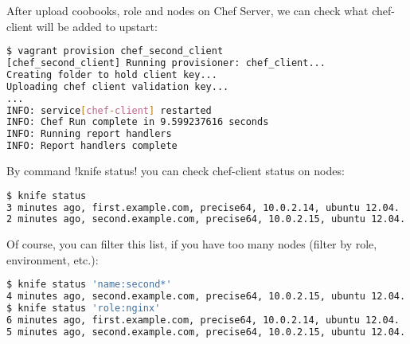After upload coobooks, role and nodes on Chef Server, we can check what chef-client will be added to upstart:

\begin{lstlisting}[language=Bash,label=lst:my-server-cloud-knife-ssh9]
$ vagrant provision chef_second_client
[chef_second_client] Running provisioner: chef_client...
Creating folder to hold client key...
Uploading chef client validation key...
...
INFO: service[chef-client] restarted
INFO: Chef Run complete in 9.599237616 seconds
INFO: Running report handlers
INFO: Report handlers complete
\end{lstlisting}

By command \inline!knife status! you can check chef-client status on nodes:

\begin{lstlisting}[language=Bash,label=lst:my-server-cloud-knife-ssh10]
$ knife status
3 minutes ago, first.example.com, precise64, 10.0.2.14, ubuntu 12.04.
2 minutes ago, second.example.com, precise64, 10.0.2.15, ubuntu 12.04.
\end{lstlisting}

Of course, you can filter this list, if you have too many nodes (filter by role, environment, etc.):

\begin{lstlisting}[language=Bash,label=lst:my-server-cloud-knife-ssh11]
$ knife status 'name:second*'
4 minutes ago, second.example.com, precise64, 10.0.2.15, ubuntu 12.04.
$ knife status 'role:nginx'
6 minutes ago, first.example.com, precise64, 10.0.2.14, ubuntu 12.04.
5 minutes ago, second.example.com, precise64, 10.0.2.15, ubuntu 12.04.
\end{lstlisting}
